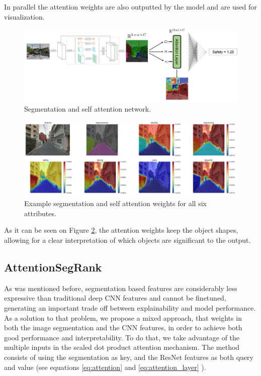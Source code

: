 In parallel the attention weights are also outputted by the model and are used for visualization.

\begin{figure}[ht]
	\begin{center}
	\includegraphics[width=1\textwidth]{./figures/self_attn.png}
	\caption[Self Attention network]{Segmentation and self attention network.}
	\label{fig:segrank_1}
	\end{center}
\end{figure}

\begin{figure}[ht]
	\begin{center}
	\includegraphics[width=1\textwidth]{./figures/self_attn_vis.png}
	\caption[Self Attention Model output]{Example segmentation and self attention weights for all six attributes.}
	\label{fig:segrank_attention}
	\end{center}
\end{figure}

As it can be seen on Figure \ref{fig:segrank_attention}, the attention weights keep the object shapes,
allowing for a clear interpretation of which objects are significant to the output.

\subsection{AttentionSegRank}
As was mentioned before, segmentation based features are considerably less expressive than
traditional deep CNN features and cannot be finetuned, generating an important trade off between explainability and model performance.
As a solution to that problem, we propose a mixed approach, that weights in both the image segmentation
and the CNN features, in order to achieve both good performance and interpretability. To do that,
we take advantage of the multiple inputs in the scaled dot product attention mechanism. The method consists
of using the segmentation as key, and the ResNet features as both query and value (see equations \ref{eq:attention} and \ref{eq:attention_layer} ).

